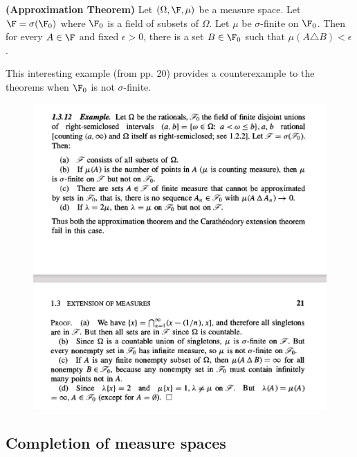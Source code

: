 \documentclass{article} %
\begin{document}
\begin{theorem}{\textbf{(Approximation Theorem)}} Let $(\Omega, \F, \mu)$ be a measure space.  Let $\F = \sigma(\F_0)$ where $\F_0$ is a field of subsets of $\Omega$.  Let $\mu$ be $\sigma$-finite on $\F_0$.  Then for every $A \in \F$ and fixed $\epsilon >0$, there is a set $B \in \F_0$ such that $\mu( A \triangle B) < \epsilon$.  
\label{thm:approximation theorem}	
\end{theorem}


\begin{example}

This interesting example (from \cite{ash2000probability} pp. 20) provides a counterexample to the theorems when $\F_0$ is not $\sigma$-finite. 

\begin{figure}[h!]
\centering
\includegraphics[width=1.\textwidth]{images/example_of_extension}	
\end{figure}
\end{example}

\subsection{Completion of measure spaces} \label{sec:completion_of_measure_spaces}
\end{document}
